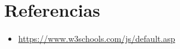 \documentclass{article}
\begin{document}
	
	
	\clearpage
	
	\section{Referencias}
	\begin{itemize}			
		\item \url{https://www.w3schools.com/js/default.asp}
	\end{itemize}	
	
	
\end{document}
